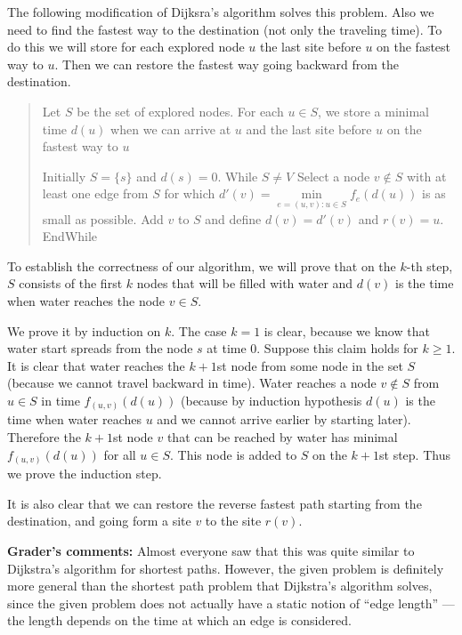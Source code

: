 \documentclass[12pt]{article}
\begin{document}
\begin{enumerate}
{The following modification of Dijksra's algorithm solves this problem.
Also we need to find the fastest way to the destination (not only the traveling time).
To do this we will store for each explored node $u$ the last
site before $u$ on the fastest way to $u$.
Then we can restore the fastest way
going backward from the destination.



\begin{quote}
\begin{code}
Let $S$ be the set of explored nodes.
  For each $u\in S$, we store a minimal time $d(u)$ when we can arrive at $u$
  and the last site before $u$ on the fastest way to $u$ %

Initially $S=\{s\}$ and $d(s)=0$.
While $S\ne V$
    Select a node $v\notin S$ with at least one edge from $S$ for which
       $d'(v)=\mathop{min}\limits_{e=(u,v):u\in S} f_e(d(u))$ is as small as possible.
    Add $v$ to $S$ and define $d(v)=d'(v)$ and $r(v)=u$.
EndWhile
\end{code}
\end{quote}



To establish the correctness of our algorithm,
we will prove that on the $k$-th step,
$S$ consists of the first $k$ nodes that will be filled with water
and $d(v)$ is the time when water reaches the node $v \in S$.

We prove it by induction on $k$.
The case $k=1$ is clear, because we know that water start spreads from the node $s$ at
time 0.
Suppose this claim holds for $k\ge 1$.
It is clear that water reaches the $k+1$st node from some node in the set $S$
(because we cannot travel backward in time).
Water reaches a node $v\notin S$ from $u\in S$ in
time $f_{(u,v)}(d(u))$ (because by induction hypothesis $d(u)$
is the time when water reaches $u$ and we cannot arrive earlier by starting later).
Therefore the $k+1$st node $v$ that can be reached by water has minimal
$f_{(u,v)}(d(u))$ for all $u\in S$.
This node is added to $S$ on the $k+1$st step.
Thus we prove the induction step.


It is also clear that we can restore the reverse fastest path starting from the
destination, and going form a site $v$ to the site $r(v)$.

\bigskip

{\bf Grader's comments:}
Almost everyone saw that this was quite similar
to Dijkstra's algorithm for shortest paths.
However, the given problem is definitely more
general than the shortest path problem that
Dijkstra's algorithm solves, since the given problem
does not actually have a static notion of ``edge length''
--- the length depends on the time at which an edge is considered.

}
\end{enumerate}
\end{document}

